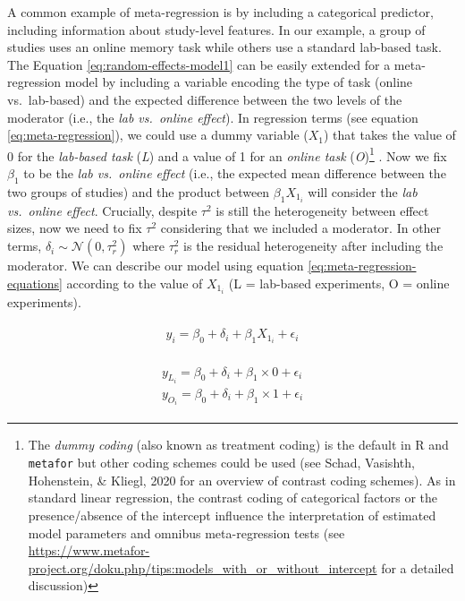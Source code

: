 \documentclass[
  man,floatsintext]{apa6}
\begin{document}
A common example of meta-regression is by including a categorical predictor, including information about study-level features. In our example, a group of studies uses an online memory task while others use a standard lab-based task. The Equation \eqref{eq:random-effects-model1} can be easily extended for a meta-regression model by including a variable encoding the type of task (online vs.~lab-based) and the expected difference between the two levels of the moderator (i.e., the \emph{lab vs.~online effect}). In regression terms (see equation \eqref{eq:meta-regression}), we could use a dummy variable (\(X_{1}\)) that takes the value of 0 for the \emph{lab-based task} (\emph{L}) and a value of 1 for an \emph{online task} (\emph{O})\footnote{The \emph{dummy coding} (also known as treatment coding) is the default in R and \texttt{metafor} but other coding schemes could be used (see Schad, Vasishth, Hohenstein, \& Kliegl, 2020 for an overview of contrast coding schemes). \color{red} As in standard linear regression, the contrast coding of categorical factors or the presence/absence of the intercept influence the interpretation of estimated model parameters and omnibus meta-regression tests (see \url{https://www.metafor-project.org/doku.php/tips:models_with_or_without_intercept} for a detailed discussion)} \color{black}. Now we fix \(\beta_{1}\) to be the \emph{lab vs.~online effect} (i.e., the expected mean difference between the two groups of studies) and the product between \color{red}\(\beta_{1}X_{1_i}\) \color{black} will consider the \emph{lab vs.~online effect}. Crucially, despite \(\tau^{2}\) is still the heterogeneity between effect sizes, now we need to fix \(\tau^{2}\) considering that we included a moderator. In other terms, \color{red} \(\delta_i \sim \mathcal{N}(0, \tau_{r}^{2})\) \color{black} where \(\tau^2_r\) is the residual heterogeneity after including the moderator. We can describe our model using equation \eqref{eq:meta-regression-equations} according to the value of \(X_{1_i}\) (L = lab-based experiments, O = online experiments).

\begin{align}
\begin{gathered}
y_i = \beta_0 + \delta_i + \beta_1 X_{1_i} + \epsilon_i
\label{eq:meta-regression}
\end{gathered}
\end{align}

\begin{align}
\begin{gathered}
y_{L_i} = \beta_0 + \delta_i + \beta_1 \times 0 + \epsilon_i \\
y_{O_i} = \beta_0 + \delta_i + \beta_1 \times 1 + \epsilon_i
\label{eq:meta-regression-equations}
\end{gathered}
\end{align}
\end{document}
